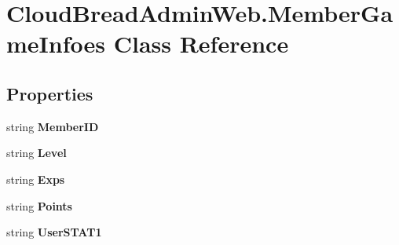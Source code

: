 \hypertarget{class_cloud_bread_admin_web_1_1_member_game_infoes}{}\section{Cloud\+Bread\+Admin\+Web.\+Member\+Game\+Infoes Class Reference}
\label{class_cloud_bread_admin_web_1_1_member_game_infoes}
\subsection*{Properties}
\begin{DoxyCompactItemize}
\item 
string {\bfseries Member\+ID}\hypertarget{class_cloud_bread_admin_web_1_1_member_game_infoes_abeb8bfa85659a46e2fe0d123324ae814}{}\label{class_cloud_bread_admin_web_1_1_member_game_infoes_abeb8bfa85659a46e2fe0d123324ae814}

\item 
string {\bfseries Level}\hypertarget{class_cloud_bread_admin_web_1_1_member_game_infoes_ab53f62460f6ce5f0cd7f470eff24191d}{}\label{class_cloud_bread_admin_web_1_1_member_game_infoes_ab53f62460f6ce5f0cd7f470eff24191d}

\item 
string {\bfseries Exps}\hypertarget{class_cloud_bread_admin_web_1_1_member_game_infoes_ab9df039b8b7a4e6385ecb3e4f180fcec}{}\label{class_cloud_bread_admin_web_1_1_member_game_infoes_ab9df039b8b7a4e6385ecb3e4f180fcec}

\item 
string {\bfseries Points}\hypertarget{class_cloud_bread_admin_web_1_1_member_game_infoes_a450ad54c6c1840404237cb077feaee9a}{}\label{class_cloud_bread_admin_web_1_1_member_game_infoes_a450ad54c6c1840404237cb077feaee9a}

\item 
string {\bfseries User\+S\+T\+A\+T1}\hypertarget{class_cloud_bread_admin_web_1_1_member_game_infoes_a5996b413e2b702a5096966cd8a358aa0}{}\label{class_cloud_bread_admin_web_1_1_member_game_infoes_a5996b413e2b702a5096966cd8a358aa0}


\end{DoxyCompactItemize}
